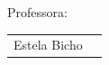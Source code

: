 \begin{titlepage}

Professora:\\
\vspace{0.3cm} %
\begin{tabular}{ll}
    Estela Bicho\\

  \end{tabular}%
  \\[0.3cm] %
\end{titlepage}
\newpage